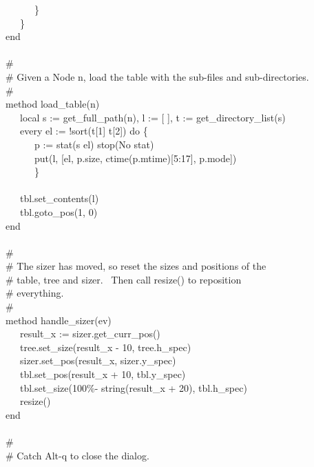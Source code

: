 {\>   \ \ \ \ \ \ \} \\
\>   \ \ \ \} \\
\>   end \\
\ \\
\>   \# \\
\>   \# Given a Node n, load the table with the sub-files and sub-directories.\\
\>   \# \\
\>   method load\_table(n) \\
\>   \ \ \ local s := get\_full\_path(n), l := [ ], t := get\_directory\_list(s) \\
\>   \ \ \ every el := !sort(t[1] {\textbar}{\textbar}{\textbar} t[2])
do \{ \\
\>   \ \ \ \ \ \ p := stat(s {\textbar}{\textbar} el) {\textbar}
stop({\textquotedbl}No stat{\textquotedbl}) \\
\>   \ \ \ \ \ \ put(l, [el, p.size, ctime(p.mtime)[5:17], p.mode]) \\
\>   \ \ \ \ \ \ \} \\
\ \\
\>   \ \ \ tbl.set\_contents(l) \\
\>   \ \ \ tbl.goto\_pos(1, 0) \\
\>   end \\
\ \\
\>   \# \\
\>   \# The sizer has moved, so reset the sizes and positions of the \\
\>   \# table, tree and sizer. \ Then call resize() to reposition \\
\>   \# everything. \\
\>   \# \\
\>   method handle\_sizer(ev) \\
\>   \ \ \ result\_x := sizer.get\_curr\_pos() \\
\>   \ \ \ tree.set\_size(result\_x - 10, tree.h\_spec) \\
\>   \ \ \ sizer.set\_pos(result\_x, sizer.y\_spec) \\
\>   \ \ \ tbl.set\_pos(result\_x + 10, tbl.y\_spec) \\
\>   \ \ \ tbl.set\_size({\textquotedbl}100\%-{\textquotedbl} {\textbar}{\textbar} string(result\_x + 20), tbl.h\_spec) \\
\>   \ \ \ resize() \\
\>   end \\
\ \\
\>   \# \\
\>   \# Catch Alt-q to close the dialog. \\
}
